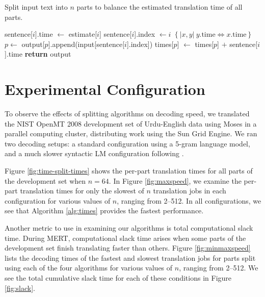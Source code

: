 \documentclass{pbml}
\begin{document}
\begin{algorithm}
\caption{Split input text into $n$ parts to balance the estimated translation time of all parts.}
\begin{algorithmic}
\State sentence[$i$].time $\gets$ estimate[$i$]
\State sentence[$i$].index $\gets i$
\EndFor
\State {} $\left\{|x,y|\ y.\mbox{time}\Leftrightarrow x.\mbox{time}\right\}$ 
\State {}
\State $p \gets$ 
\State {}
\State output[$p$].append(input[sentence[$i$].index])
\State times[$p$] $\gets$ times[$p$] $ + $ sentence[$i$].time
\EndFor
\State \textbf{return} output
\EndFunction
\end{algorithmic}
\label{alg:times}
\end{algorithm}

\section{Experimental Configuration}

To observe the effects of splitting algorithms on decoding speed, we translated the NIST OpenMT 2008 development set of Urdu-English data using Moses in a parallel computing cluster, distributing work using the Sun Grid Engine. We ran two decoding setups: a standard configuration using a 5-gram language model, and a much slower syntactic LM configuration following \citet{schwartzetal11}. 

Figure \ref{fig:time-split-times} shows the per-part translation times for all parts of the development set when $n=64$. 
%
In Figure \ref{fig:maxspeed}, we examine the per-part translation times for only the slowest of $n$ translation jobs in each configuration for various values of $n$, ranging from 2--512.
%
In all configurations, we see that Algorithm \ref{alg:times} provides the fastest performance.

Another metric to use in examining our algorithms is total computational slack time.
%
During MERT, computational slack time arises when some parts of the development set finish translating faster than others.
%
Figure \ref{fig:minmaxspeed} lists the decoding times of the fastest and slowest translation jobs for parts split using each of the four algorithms for various values of $n$, ranging from 2--512.
%
We see the total cumulative slack time for each of these conditions in Figure \ref{fig:slack}.
\end{document}
